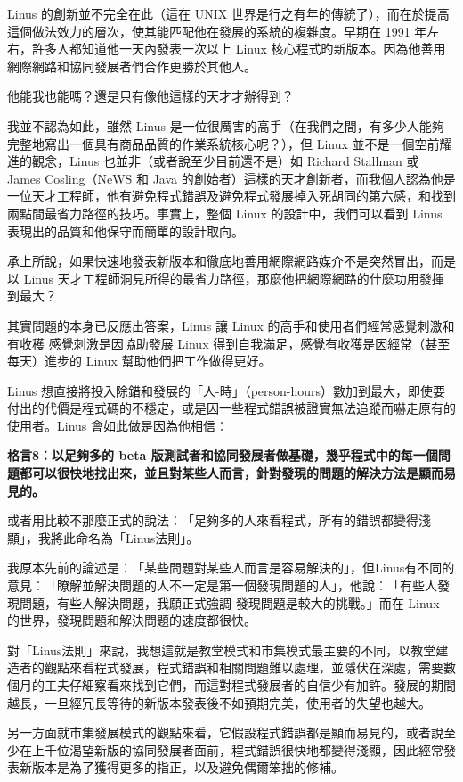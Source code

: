\documentclass[10pt, b5paper]{book}
\makeatletter
\newcommand*{\shifttext}[2]{%
  \settowidth{\@tempdima}{#2}%
  \makebox[\@tempdima]{\hspace*{#1}#2}%
}
\makeatother
\begin{document}
Linus 的創新並不完全在此（這在 UNIX
世界是行之有年的傳統了），而在於提高這個做法效力的層次，使其能匹配他在發展的系統的複雜度。早期在
1991 年左右，許多人都知道他一天內發表一次以上 Linux
核心程式旳新版本。因為他善用網際網路和協同發展者們合作更勝於其他人。

他能我也能嗎？還是只有像他這樣的天才才辦得到？

我並不認為如此，雖然 Linus
是一位很厲害的高手（在我們之間，有多少人能夠完整地寫出一個具有商品品質的作業系統核心呢？），但
Linux 並不是一個空前耀進的觀念，Linus 也並非（或者說至少目前還不是）如
Richard Stallman 或 James Cosling（NeWS 和 Java
的創始者）這樣的天才創新者，而我個人認為他是一位天才工程師，他有避免程式錯誤及避免程式發展掉入死胡同的第六感，和找到兩點間最省力路徑的技巧。事實上，整個
Linux 的設計中，我們可以看到 Linus 表現出的品質和他保守而簡單的設計取向。

承上所說，如果快速地發表新版本和徹底地善用網際網路媒介不是突然冒出，而是以
Linus
天才工程師洞見所得的最省力路徑，那麼他把網際網路的什麼功用發揮到最大？

其實問題的本身已反應出答案，Linus 讓 Linux
的高手和使用者們經常感覺刺激和有收穫 \shifttext{1pt}{---}\shifttext{-1pt}{---} 感覺刺激是因協助發展 Linux
得到自我滿足，感覺有收獲是因經常（甚至每天）進步的 Linux
幫助他們把工作做得更好。

Linus
想直接將投入除錯和發展的「人-時」（person-hours）數加到最大，即使要付出的代價是程式碼的不穩定，或是因一些程式錯誤被證實無法追蹤而嚇走原有的使用者。Linus
會如此做是因為他相信︰

\textbf{格言8︰以足夠多的 beta
版測試者和協同發展者做基礎，幾乎程式中的每一個問題都可以很快地找出來，並且對某些人而言，針對發現的問題的解決方法是顯而易見的。}

或者用比較不那麼正式的說法︰「足夠多的人來看程式，所有的錯誤都變得淺顯」，我將此命名為「Linus法則」。

我原本先前的論述是︰「某些問題對某些人而言是容易解決的」，但Linus有不同的意見︰「瞭解並解決問題的人不一定是第一個發現問題的人」，他說︰「有些人發現問題，有些人解決問題，我願正式強調
\shifttext{1pt}{---}\shifttext{-1pt}{---} 發現問題是較大的挑戰。」而在 Linux
的世界，發現問題和解決問題的速度都很快。

對「Linus法則」來說，我想這就是教堂模式和市集模式最主要的不同，以教堂建造者的觀點來看程式發展，程式錯誤和相關問題難以處理，並隱伏在深處，需要數個月的工夫仔細察看來找到它們，而這對程式發展者的自信少有加許。發展的期間越長，一旦經冗長等待的新版本發表後不如預期完美，使用者的失望也越大。

另一方面就市集發展模式的觀點來看，它假設程式錯誤都是顯而易見的，或者說至少在上千位渴望新版的協同發展者面前，程式錯誤很快地都變得淺顯，因此經常發表新版本是為了獲得更多的指正，以及避免偶爾笨拙的修補。
\end{document}
